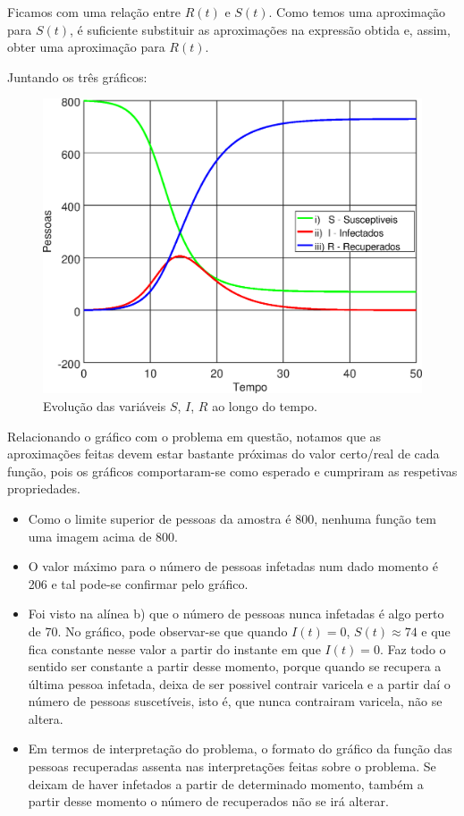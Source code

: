 \documentclass[portuguese, a4paper]{article}
\begin{document}
		\par
		Ficamos com uma relação entre $R(t)$ e $S(t)$. Como temos uma
		aproximação para $S(t)$, é suficiente substituir as aproximações na
		expressão obtida e, assim, obter uma aproximação para $R(t)$.

		\par
		Juntando os três gráficos:

		\begin{figure}[H]
			\centering
			\includegraphics[width=0.70\linewidth]{IIIc_fitted}
			\captionsetup{width=0.70\linewidth}
			\caption[Caption]{Evolução das variáveis $S$, $I$, $R$ ao longo do
			tempo.
			\footnotemark}
		\end{figure}

		\par
		Relacionando o gráfico com o problema em questão, notamos que as aproximações feitas devem estar
		bastante próximas do valor certo/real de cada função, pois os gráficos comportaram-se como esperado e cumpriram as respetivas propriedades.

		\begin{itemize}
		\item Como o limite superior de pessoas da amostra é 800, nenhuma função tem uma imagem acima de 800.
		\item O valor máximo para o número de pessoas infetadas num dado momento é 206 e tal pode-se confirmar pelo gráfico.
		\item Foi visto na alínea b) que o número de pessoas
		nunca infetadas é algo perto de 70. %
		No gráfico, pode observar-se que quando $I(t) = 0$, $S(t) \approx 74$ e que fica constante nesse valor a partir do instante em que $I(t) = 0$.
		Faz todo o sentido ser constante a partir desse momento, porque quando
		se recupera a última pessoa infetada, deixa de ser possivel contrair
		varicela e a partir daí o número de pessoas suscetíveis, isto é, que
		nunca contrairam varicela, não se altera.
		\item Em termos de interpretação do problema, o formato do gráfico da função das pessoas recuperadas assenta nas interpretações
		feitas sobre o problema. Se deixam de haver infetados a partir de determinado momento,
		também a partir desse momento o número de recuperados não se irá
		alterar.
		\end{itemize}
\end{document}
